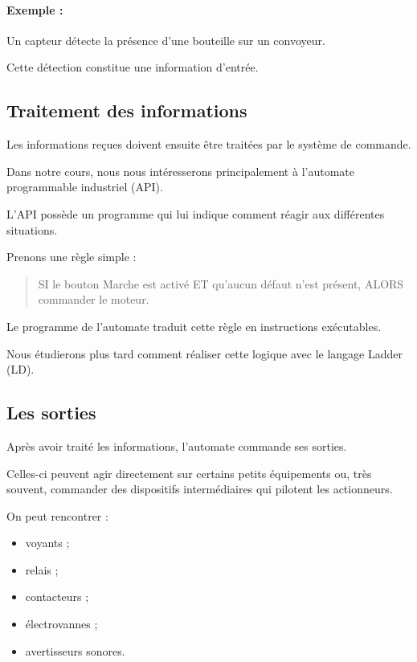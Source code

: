\documentclass[12pt,a4paper]{book}
\begin{document}
\paragraph{Exemple :}
Un capteur détecte la présence d'une bouteille sur un convoyeur.

Cette détection constitue une information d'entrée.

\subsection{Traitement des informations}

Les informations reçues doivent ensuite être traitées par le système de commande.

Dans notre cours, nous nous intéresserons principalement à l'automate programmable industriel (API).

L'API possède un programme qui lui indique comment réagir aux différentes situations.

Prenons une règle simple :

\begin{quote}
SI le bouton Marche est activé ET qu'aucun défaut n'est présent, ALORS commander le moteur.
\end{quote}

Le programme de l'automate traduit cette règle en instructions exécutables.

Nous étudierons plus tard comment réaliser cette logique avec le langage Ladder (LD).

\subsection{Les sorties}

Après avoir traité les informations, l'automate commande ses sorties.

Celles-ci peuvent agir directement sur certains petits équipements ou, très souvent, commander des dispositifs intermédiaires qui pilotent les actionneurs.

On peut rencontrer :

\begin{itemize}
    \item voyants ;
    \item relais ;
    \item contacteurs ;
    \item électrovannes ;
    \item avertisseurs sonores.
\end{itemize}
\end{document}
